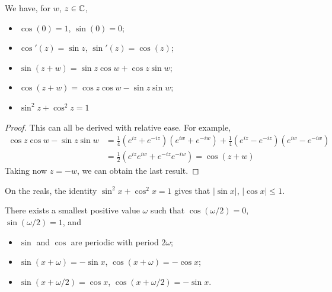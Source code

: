\documentclass{../../template/note}
\begin{document}
    \begin{lemma}
        We have, for \(w\), \(z \in \mathbb C\),
        \begin{itemize}
            \item \(\cos(0) = 1\), \(\sin(0) = 0\);
            \item \(\cos'(z) = \sin z\), \(\sin'(z) = \cos(z)\);
            \item \(\sin(z+w) = \sin z \cos w + \cos z \sin w\);
            \item \(\cos(z+w) = \cos z \cos w - \sin z \sin w\);
            \item \(\sin^2 z + \cos^2 z = 1\)
        \end{itemize}
    \end{lemma}
    
    \begin{proof}
        This can all be derived with relative ease. For example,
        \begin{align*}
            \cos z \cos w - \sin z \sin w &= \frac 1 4 \left(e^{iz}+e^{-iz}\right)\left(e^{iw}+e^{-iw}\right) + \frac 1 4 \left(e^{iz}-e^{-iz}\right)\left(e^{iw}-e^{-iw}\right) \\
            &= \frac{1}{2} \left(e^{iz}e^{iw}+e^{-iz}e^{-iw}\right) = \cos(z+w)
        \end{align*}
        Taking now \(z=-w\), we can obtain the last result.
    \end{proof}
    
    On the reals, the identity \(\sin^2 x + \cos^2 x = 1\) gives that \(|\sin x|\), \(|\cos x| \leq 1\).

    \begin{proposition}
        There exists a smallest positive value \(\omega\) such that \(\cos(\omega/2) = 0\), \(\sin(\omega/2)=1\), and
        \begin{itemize}
            \item \(\sin\) and \(\cos\) are periodic with period \(2\omega\);
            \item \(\sin(x+\omega) = -\sin x\), \(\cos(x+\omega)=-\cos x\);
            \item \(\sin(x+\omega/2) = \cos x\), \(\cos(x+\omega/2)=-\sin x\).
        \end{itemize}
    \end{proposition}
    
\end{document}
